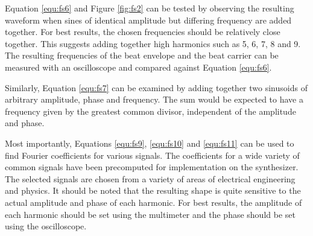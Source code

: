 Equation \ref{equ:fs6} and Figure \ref{fig:fs2} can be tested by observing the resulting waveform when sines of identical amplitude but differing frequency are added together. For best results, the chosen frequencies should be relatively close together. This suggests adding together high harmonics such as 5, 6, 7, 8 and 9. The resulting frequencies of the beat envelope and the beat carrier can be measured with an oscilloscope and compared against Equation \ref{equ:fs6}.

Similarly, Equation \ref{equ:fs7} can be examined by adding together two sinusoids of arbitrary amplitude, phase and frequency. The sum would be expected to have a frequency given by the greatest common divisor, independent of the amplitude and phase. 

Most importantly, Equations \ref{equ:fs9}, \ref{equ:fs10} and \ref{equ:fs11} can be used to find Fourier coefficients for various signals. The coefficients for a wide variety of common signals have been precomputed for implementation on the synthesizer. The selected signals are chosen from a variety of areas of electrical engineering and physics. It should be noted that the resulting shape is quite sensitive to the actual amplitude and phase of each harmonic. For best results, the amplitude of each harmonic should be set using the multimeter and the phase should be set using the oscilloscope.

